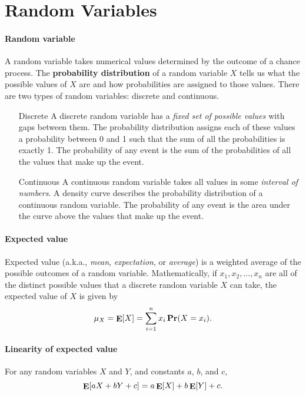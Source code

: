 \section{Random Variables}

\paragraph{Random variable} A random variable takes numerical values determined by the outcome of a chance process. The \textbf{probability distribution} of a random variable $X$ tells us what the possible values of $X$ are and how probabilities are assigned to those values. There are two types of random variables: discrete and continuous.
\begin{itemize}[font=\sffamily\bfseries, leftmargin=1.95cm, style=nextline, itemsep=0cm]
\item[Discrete] A discrete random variable has a \textit{fixed set of possible values} with gaps between them. The probability distribution assigns each of these values a probability between 0 and 1 such that the sum of all the probabilities is exactly 1. The probability of any event is the sum of the probabilities of all the values that make up the event.
\item[Continuous] A continuous random variable takes all values in some \textit{interval of numbers}. A density curve describes the probability distribution of a continuous random variable. The probability of any event is the area under the curve above the values that make up the event.
\end{itemize}

\paragraph{Expected value} Expected value (a.k.a., \textit{mean}, \textit{expectation}, or \textit{average}) is a weighted average of the possible outcomes of a random variable. Mathematically, if $x_1, x_2, ..., x_n$ are all of the distinct possible values that a discrete random variable $X$ can take, the expected value of $X$ is given by
$$
    \mu_X = \mathop{\mathbf{E}}[X] = \sum_{i=1}^{n} x_i \mathop{\mathbf{Pr}}(X=x_i).
$$

\paragraph{Linearity of expected value} For any random variables $X$ and $Y$, and constants $a$, $b$, and $c$,
$$
    \mathop{\mathbf{E}}[aX + bY + c] = a\mathop{\mathbf{E}}[X] + b\mathop{\mathbf{E}}[Y] + c.
$$


